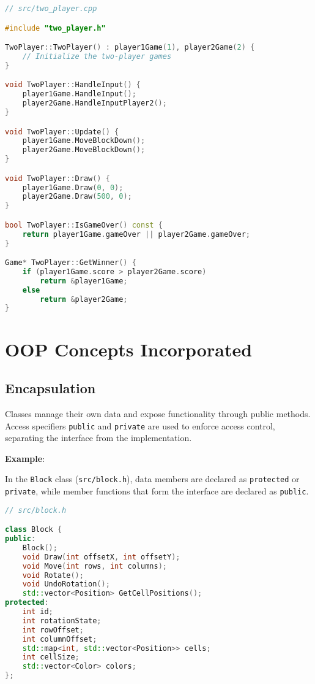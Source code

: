 \documentclass{article}
\begin{document}
\begin{lstlisting}[language=C++]
// src/two_player.cpp

#include "two_player.h"

TwoPlayer::TwoPlayer() : player1Game(1), player2Game(2) {
    // Initialize the two-player games
}

void TwoPlayer::HandleInput() {
    player1Game.HandleInput();
    player2Game.HandleInputPlayer2();
}

void TwoPlayer::Update() {
    player1Game.MoveBlockDown();
    player2Game.MoveBlockDown();
}

void TwoPlayer::Draw() {
    player1Game.Draw(0, 0);
    player2Game.Draw(500, 0);
}

bool TwoPlayer::IsGameOver() const {
    return player1Game.gameOver || player2Game.gameOver;
}

Game* TwoPlayer::GetWinner() {
    if (player1Game.score > player2Game.score) 
        return &player1Game;
    else 
        return &player2Game;
}
\end{lstlisting}
\section{OOP Concepts Incorporated}

\subsection{Encapsulation}

Classes manage their own data and expose functionality through public methods. Access specifiers \texttt{public} and \texttt{private} are used to enforce access control, separating the interface from the implementation.

\textbf{Example}:

In the \texttt{Block} class (\texttt{src/block.h}), data members are declared as \texttt{protected} or \texttt{private}, while member functions that form the interface are declared as \texttt{public}.

\begin{lstlisting}[language=C++]
// src/block.h

class Block {
public:
    Block();
    void Draw(int offsetX, int offsetY);
    void Move(int rows, int columns);
    void Rotate();
    void UndoRotation();
    std::vector<Position> GetCellPositions();
protected:
    int id;
    int rotationState;
    int rowOffset;
    int columnOffset;
    std::map<int, std::vector<Position>> cells;
    int cellSize;
    std::vector<Color> colors;
};
\end{lstlisting}
\end{document}
